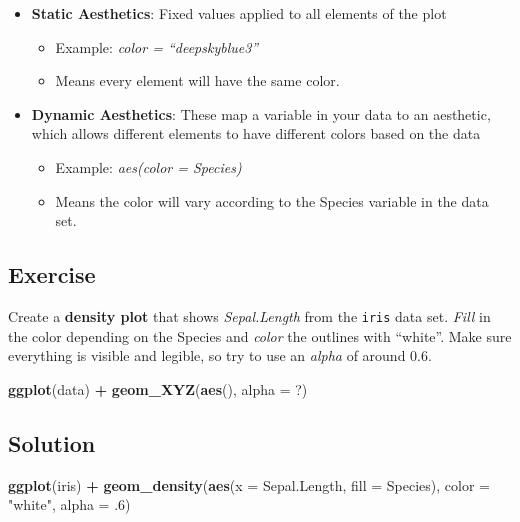 \documentclass[
]{book}
\newenvironment{Shaded}{\begin{snugshade}}{\end{snugshade}}
\newcommand{\AttributeTok}[1]{\textcolor[rgb]{0.13,0.29,0.53}{#1}}
\newcommand{\DecValTok}[1]{\textcolor[rgb]{0.00,0.00,0.81}{#1}}
\newcommand{\FunctionTok}[1]{\textcolor[rgb]{0.13,0.29,0.53}{\textbf{#1}}}
\newcommand{\NormalTok}[1]{#1}
\newcommand{\SpecialCharTok}[1]{\textcolor[rgb]{0.81,0.36,0.00}{\textbf{#1}}}
\newcommand{\StringTok}[1]{\textcolor[rgb]{0.31,0.60,0.02}{#1}}
\providecommand{\tightlist}{%
  \setlength{\itemsep}{0pt}\setlength{\parskip}{0pt}}
\begin{document}
\begin{itemize}
\tightlist
\item
  \textbf{Static Aesthetics}: Fixed values applied to all elements of the plot

  \begin{itemize}
  \tightlist
  \item
    Example: \emph{color = ``deepskyblue3''}
  \item
    Means every element will have the same color.
  \end{itemize}
\item
  \textbf{Dynamic Aesthetics}: These map a variable in your data to an aesthetic, which allows different elements to have different colors based on the data

  \begin{itemize}
  \tightlist
  \item
    Example: \emph{aes(color = Species)}
  \item
    Means the color will vary according to the Species variable in the data set.
  \end{itemize}
\end{itemize}

\subsection{Exercise}\label{exercise-5}

Create a \textbf{density plot} that shows \emph{Sepal.Length} from the \texttt{iris} data set.
\emph{Fill} in the color depending on the Species and \emph{color} the outlines with ``white''.
Make sure everything is visible and legible, so try to use an \emph{alpha} of around 0.6.

\begin{Shaded}
\begin{Highlighting}[]
\FunctionTok{ggplot}\NormalTok{(data) }\SpecialCharTok{+} 
  \FunctionTok{geom\_XYZ}\NormalTok{(}\FunctionTok{aes}\NormalTok{(), }\AttributeTok{alpha =}\NormalTok{ ?)}
\end{Highlighting}
\end{Shaded}

\subsection{Solution}\label{solution-9}

\begin{Shaded}
\begin{Highlighting}[]
\FunctionTok{ggplot}\NormalTok{(iris) }\SpecialCharTok{+} 
  \FunctionTok{geom\_density}\NormalTok{(}\FunctionTok{aes}\NormalTok{(}\AttributeTok{x =}\NormalTok{ Sepal.Length, }\AttributeTok{fill =}\NormalTok{ Species), }
               \AttributeTok{color =} \StringTok{"white"}\NormalTok{, }\AttributeTok{alpha =}\NormalTok{ .}\DecValTok{6}\NormalTok{)}
\end{Highlighting}
\end{Shaded}
\end{document}
